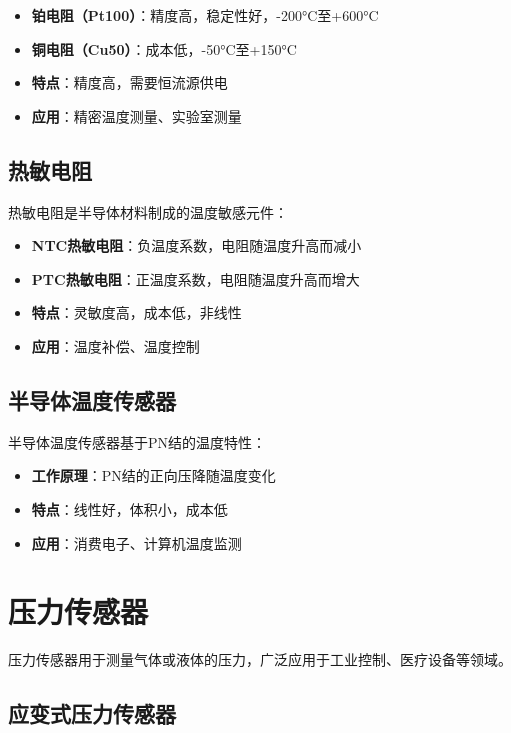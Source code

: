 \documentclass[12pt,UTF8]{ctexbook}
\begin{document}
\begin{itemize}[leftmargin=2cm]
	\item \textbf{铂电阻（Pt100）}：精度高，稳定性好，-200°C至+600°C
	\item \textbf{铜电阻（Cu50）}：成本低，-50°C至+150°C
	\item \textbf{特点}：精度高，需要恒流源供电
	\item \textbf{应用}：精密温度测量、实验室测量
\end{itemize}

\subsection{热敏电阻}

热敏电阻是半导体材料制成的温度敏感元件：

\begin{itemize}[leftmargin=2cm]
	\item \textbf{NTC热敏电阻}：负温度系数，电阻随温度升高而减小
	\item \textbf{PTC热敏电阻}：正温度系数，电阻随温度升高而增大
	\item \textbf{特点}：灵敏度高，成本低，非线性
	\item \textbf{应用}：温度补偿、温度控制
\end{itemize}

\subsection{半导体温度传感器}

半导体温度传感器基于PN结的温度特性：

\begin{itemize}[leftmargin=2cm]
	\item \textbf{工作原理}：PN结的正向压降随温度变化
	\item \textbf{特点}：线性好，体积小，成本低
	\item \textbf{应用}：消费电子、计算机温度监测
\end{itemize}

\section{压力传感器}

压力传感器用于测量气体或液体的压力，广泛应用于工业控制、医疗设备等领域。

\subsection{应变式压力传感器}
\end{document}
